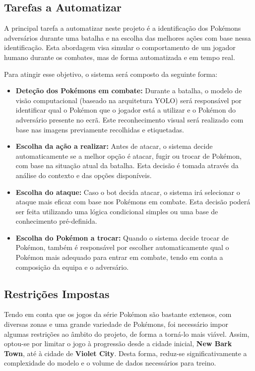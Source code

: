 \subsection{Tarefas a Automatizar} \label{tarefas_a_automatizar}
A principal tarefa a automatizar neste projeto é a identificação dos Pokémons adversários durante uma batalha e na escolha das melhores ações com base nessa identificação. Esta abordagem visa simular o comportamento de um jogador humano durante os combates, mas de forma automatizada e em tempo real.

Para atingir esse objetivo, o sistema será composto da seguinte forma:

\begin{itemize} 
    \item \textbf{Deteção dos Pokémons em combate:} Durante a batalha, o modelo de visão computacional (baseado na arquitetura YOLO) será responsável por identificar qual o Pokémon que o jogador está a utilizar e o Pokémon do adversário presente no ecrã. Este reconhecimento visual será realizado com base nas imagens previamente recolhidas e etiquetadas.

    \item \textbf{Escolha da ação a realizar:} Antes de atacar, o sistema decide automaticamente se a melhor opção é atacar, fugir ou trocar de Pokémon, com base na situação atual da batalha. Esta decisão é tomada através da análise do contexto e das opções disponíveis.
    
    \item \textbf{Escolha do ataque:} Caso o bot decida atacar, o sistema irá selecionar o ataque mais eficaz com base nos Pokémons em combate. Esta decisão poderá ser feita utilizando uma lógica condicional simples ou uma base de conhecimento pré-definida.

    \item \textbf{Escolha do Pokémon a trocar:} Quando o sistema decide trocar de Pokémon, também é responsável por escolher automaticamente qual o Pokémon mais adequado para entrar em combate, tendo em conta a composição da equipa e o adversário.
\end{itemize}

\subsection{Restrições Impostas} \label{restricoes_impostas}
Tendo em conta que os jogos da série Pokémon são bastante extensos, com diversas zonas e uma grande variedade de Pokémons, foi necessário impor algumas restrições ao âmbito do projeto, de forma a torná-lo mais viável. Assim, optou-se por limitar o jogo à progressão desde a cidade inicial, \textbf{New Bark Town}, até à cidade de \textbf{Violet City}. Desta forma, reduz-se significativamente a complexidade do modelo e o volume de dados necessários para treino.

